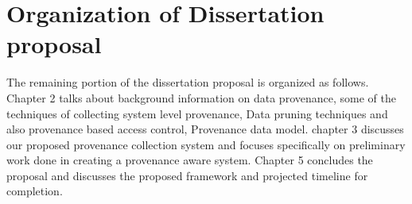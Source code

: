 \section{Organization of Dissertation proposal}

The remaining portion of the dissertation proposal is organized as follows.  Chapter 2 talks about background information on data provenance, some of the techniques of collecting system level provenance, Data pruning techniques and also provenance based access control, Provenance data model. chapter 3 discusses our proposed provenance collection system  and focuses specifically on preliminary work done in creating a provenance aware system. Chapter 5 concludes the proposal and discusses the proposed framework and projected timeline for completion.

